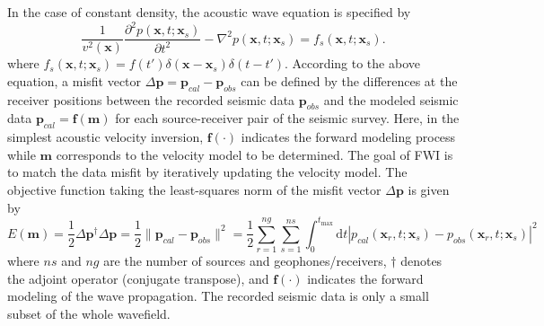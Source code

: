 In the case of constant density, the acoustic wave equation is specified by
\begin{equation}\label{eq:acoustic}
\frac{1}{v^2(\textbf{x})}\frac{\partial^2 p(\textbf{x},t;\textbf{x}_s)}{\partial t^2}-\nabla^2 p(\textbf{x},t;\textbf{x}_s)=f_s(\textbf{x},t;\textbf{x}_s).
\end{equation}
where $ f_s(\textbf{x},t;\textbf{x}_s)=f(t')\delta(\textbf{x}-\textbf{x}_s)\delta(t-t')$. 
According to the above equation, a misfit vector  $\Delta \textbf{p}=\textbf{p}_{cal}-\textbf{p}_{obs}$ can be defined by the differences at the receiver positions between the recorded seismic data $\textbf{p}_{obs}$ and the modeled seismic data $\textbf{p}_{cal}=\textbf{f}(\textbf{m})$ for each source-receiver pair of the seismic survey. Here, in the simplest acoustic velocity inversion, $\textbf{f}(\cdot)$ indicates the forward modeling process while $\textbf{m}$ corresponds to the velocity model to be determined. The goal of FWI is to match the data misfit by iteratively updating the velocity model. The objective function taking the least-squares norm of the misfit vector $\Delta \textbf{p}$ is given by
\begin{equation}\label{eq:obj}
E(\textbf{m})=\frac{1}{2}\Delta \textbf{p}^{\dagger}\Delta \textbf{p}
=\frac{1}{2}\|\textbf{p}_{cal}-\textbf{p}_{obs}\|^2
=\frac{1}{2}\sum_{r=1}^{ng}\sum_{s=1}^{ns}\int_{0}^{t_{\max}}\mathrm{d}t|p_{cal}(\textbf{x}_r, t;\textbf{x}_s)-p_{obs}(\textbf{x}_r, t;\textbf{x}_s)|^2
\end{equation}
where $ns$ and $ng$ are the number of sources and geophones/receivers, $\dagger$ denotes the adjoint operator (conjugate transpose), and $\textbf{f}(\cdot)$ indicates the forward modeling of the wave propagation. The recorded seismic data is only a small subset of the whole wavefield.

